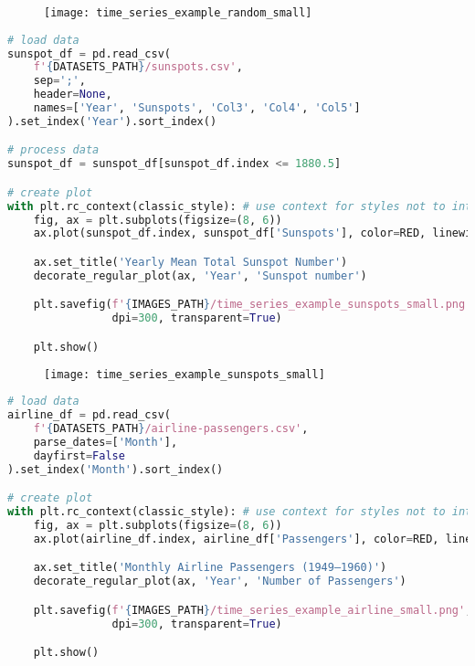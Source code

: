 \begin{figure}[h!]
  \centering
  \texttt{[image: time\_series\_example\_random\_small]}
\end{figure}\newpage


\begin{center}
  \begin{lstlisting}[language=Python, 
  caption={Среднегодовое общее количество солнечных пятен \cite{silso}.}, 
  label={lst:time_series_example_sunspots_small}]
# load data
sunspot_df = pd.read_csv(
    f'{DATASETS_PATH}/sunspots.csv',
    sep=';', 
    header=None, 
    names=['Year', 'Sunspots', 'Col3', 'Col4', 'Col5']
).set_index('Year').sort_index()

# process data
sunspot_df = sunspot_df[sunspot_df.index <= 1880.5]

# create plot
with plt.rc_context(classic_style): # use context for styles not to interfere
    fig, ax = plt.subplots(figsize=(8, 6))
    ax.plot(sunspot_df.index, sunspot_df['Sunspots'], color=RED, linewidth=1.5)

    ax.set_title('Yearly Mean Total Sunspot Number')
    decorate_regular_plot(ax, 'Year', 'Sunspot number')

    plt.savefig(f'{IMAGES_PATH}/time_series_example_sunspots_small.png', 
                dpi=300, transparent=True)

    plt.show()
  \end{lstlisting}
\end{center}

\begin{figure}[h!]
  \centering
  \texttt{[image: time\_series\_example\_sunspots\_small]}
\end{figure}\newpage


\begin{center}
  \begin{lstlisting}[language=Python, 
  caption={Пассажиры авиалиний.}, 
  label={lst:time_series_example_airline_small}]
# load data
airline_df = pd.read_csv(
    f'{DATASETS_PATH}/airline-passengers.csv',
    parse_dates=['Month'],
    dayfirst=False
).set_index('Month').sort_index()

# create plot
with plt.rc_context(classic_style): # use context for styles not to interfere
    fig, ax = plt.subplots(figsize=(8, 6))
    ax.plot(airline_df.index, airline_df['Passengers'], color=RED, linewidth=1.5)

    ax.set_title('Monthly Airline Passengers (1949–1960)')
    decorate_regular_plot(ax, 'Year', 'Number of Passengers')

    plt.savefig(f'{IMAGES_PATH}/time_series_example_airline_small.png', 
                dpi=300, transparent=True)

    plt.show()
  \end{lstlisting}
\end{center}

